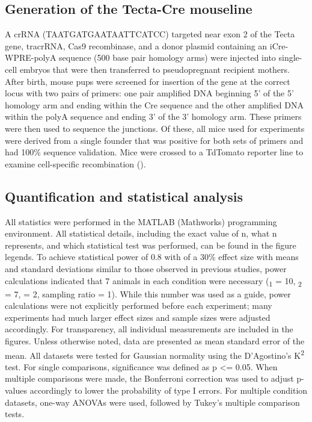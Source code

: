 \documentclass[9pt,lineno]{elife}
\begin{document}
\subsection{Generation of the Tecta-Cre mouseline}
A crRNA (TAATGATGAATAATTCATCC) targeted near exon 2 of the Tecta gene, tracrRNA, Cas9 recombinase, and a donor plasmid containing an iCre-WPRE-polyA sequence (500 base pair homology arms) were injected into single-cell embryos that were then transferred to pseudopregnant recipient mothers. After birth, mouse pups were screened for insertion of the gene at the correct locus with two pairs of primers: one pair amplified DNA beginning 5’ of the 5’ homology arm and ending within the Cre sequence and the other amplified DNA within the polyA sequence and ending 3’ of the 3’ homology arm. These primers were then used to sequence the junctions. Of these, all mice used for experiments were derived from a single founder that was positive for both sets of primers and had 100\% sequence validation. Mice were crossed to a TdTomato reporter line to examine cell-specific recombination ().

\subsection{Quantification and statistical analysis}
All statistics were performed in the MATLAB (Mathworks) programming environment. All statistical details, including the exact value of n, what n represents, and which statistical test was performed, can be found in the figure legends. To achieve statistical power of 0.8 with of a 30\% effect size with means and standard deviations similar to those observed in previous studies, power calculations indicated that 7 animals in each condition were necessary (\textmu \textsubscript{1} = 10, \textmu \textsubscript{2} = 7, \textsigma \hspace{0.4mm} = 2, sampling ratio = 1). While this number was used as a guide, power calculations were not explicitly performed before each experiment; many experiments had much larger effect sizes and sample sizes were adjusted accordingly. For transparency, all individual measurements are included in the figures. Unless otherwise noted, data are presented as mean \textpm \hspace{0.3mm} standard error of the mean. All datasets were tested for Gaussian normality using the D’Agostino’s K\textsuperscript{2} test. For single comparisons, significance was defined as p <= 0.05. When multiple comparisons were made, the Bonferroni correction was used to adjust p-values accordingly to lower the probability of type I errors. For multiple condition datasets, one-way ANOVAs were used, followed by Tukey’s multiple comparison tests.
\end{document}
